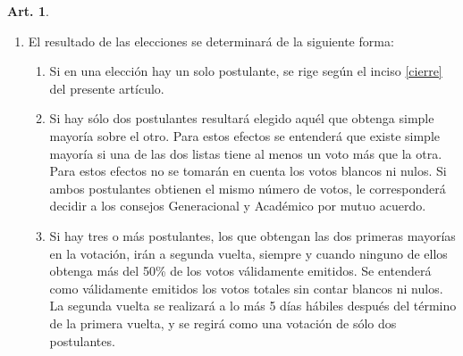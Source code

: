 \documentclass[letterpaper,11pt]{article}
\theoremstyle{definition}%
\newtheorem{art}{Art.} %
\begin{document}
\begin{art}
\begin{enumerate}
		\item El resultado de las elecciones se determinará de la siguiente forma:
		      \begin{enumerate}
			      \item Si en una elección hay un solo postulante, se rige según el inciso \ref{cierre} del presente artículo.
			      \item Si hay sólo dos postulantes resultará elegido aquél que obtenga simple mayoría sobre el otro. Para estos efectos se entenderá que existe simple mayoría si una de las dos listas tiene al menos un voto más que la otra. Para estos efectos no se tomarán en cuenta los votos blancos ni nulos. Si ambos postulantes obtienen el mismo número de votos, le corresponderá decidir a los consejos Generacional y Académico por mutuo acuerdo.
			      \item Si hay tres o más postulantes, los que obtengan las dos primeras mayorías en la votación, irán a segunda vuelta, siempre y cuando ninguno de ellos obtenga más del 50\% de los votos válidamente emitidos. Se entenderá como válidamente emitidos los votos totales sin contar blancos ni nulos. La segunda vuelta se realizará a lo más 5 días hábiles después del término de la primera vuelta, y se regirá como una votación de sólo dos postulantes.
		      \end{enumerate}
	\end{enumerate}
\end{art}
\end{document}
